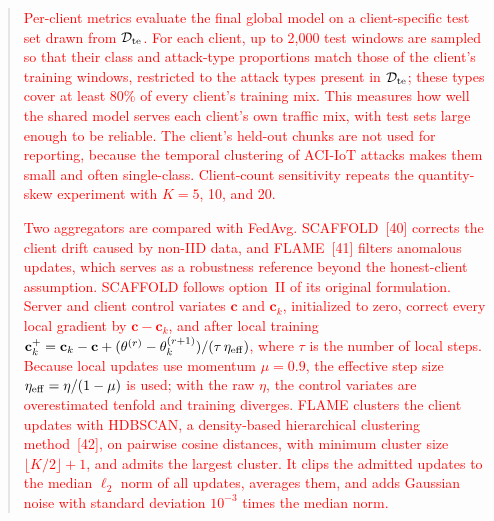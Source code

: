 \documentclass[11pt]{article}
\newenvironment{excerpt}{\begin{quote}\sloppy}{\end{quote}}
\begin{document}
\begin{excerpt}
\textcolor{red}{Per-client metrics
evaluate the final global model on a client-specific test set drawn
from $\mathcal{D}_{\rm te}$. For each client, up to 2{,}000 test
windows are sampled so that their class and attack-type proportions
match those of the client's training windows, restricted to the
attack types present in $\mathcal{D}_{\rm te}$; these types cover at
least 80\% of every client's training mix. This measures how well the
shared model serves each client's own traffic mix, with test sets
large enough to be reliable. The client's held-out chunks are not
used for reporting, because the temporal clustering of ACI-IoT
attacks makes them small and often single-class. Client-count
sensitivity repeats the quantity-skew experiment with $K=5$, 10, and
20.}

\textcolor{red}{Two aggregators are compared with FedAvg.
SCAFFOLD~{[40]} corrects the client drift
caused by non-IID data, and FLAME~{[41]} filters
anomalous updates, which serves as a robustness reference beyond the
honest-client assumption. SCAFFOLD follows
option~II of its original formulation. Server and client control variates $\mathbf{c}$ and
$\mathbf{c}_k$, initialized to zero, correct every local gradient by
$\mathbf{c}-\mathbf{c}_k$, and after local training
$\mathbf{c}_k^{+}=\mathbf{c}_k-\mathbf{c}+(\theta^{(r)}-
\theta_k^{(r+1)})/(\tau\,\eta_{\rm eff})$, where $\tau$ is the number
of local steps. Because local updates use momentum $\mu=0.9$, the
effective step size $\eta_{\rm eff}=\eta/(1-\mu)$ is used; with the
raw $\eta$, the control variates are overestimated tenfold and
training diverges. FLAME clusters the client
updates with HDBSCAN, a density-based hierarchical clustering
method~{[42]}, on pairwise cosine distances, with minimum cluster size
$\lfloor K/2\rfloor+1$, and admits the largest cluster. It clips the
admitted updates to the median $\ell_2$ norm of all updates, averages
them, and adds Gaussian noise with standard deviation $10^{-3}$ times
the median norm.}
\end{excerpt}
\end{document}
